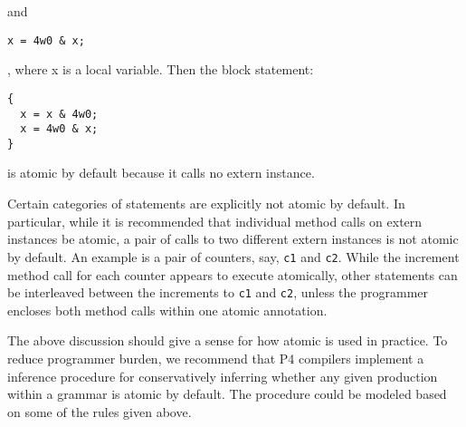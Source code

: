 and
\begin{verbatim}
x = 4w0 & x;
\end{verbatim},
where x is a local variable. Then the block statement:

\begin{verbatim}
{
  x = x & 4w0;
  x = 4w0 & x;
}
\end{verbatim}
is atomic by default because it calls no extern instance.

Certain categories of statements are explicitly not atomic by default. In
particular, while it is recommended that individual method calls on extern
instances be atomic, a pair of calls to two different extern instances is not
atomic by default. An example is a pair of counters, say, \texttt{c1} and
\texttt{c2}.  While the increment method call for each counter appears to
execute atomically, other statements can be interleaved between the increments
to \texttt{c1} and \texttt{c2}, unless the programmer encloses both method
calls within one atomic annotation.

The above discussion should give a sense for how atomic is used in practice. To
reduce programmer burden, we recommend that P4 compilers implement a inference
procedure for conservatively inferring whether any given production within a
grammar is atomic by default. The procedure could be modeled based on some of
the rules given above.
